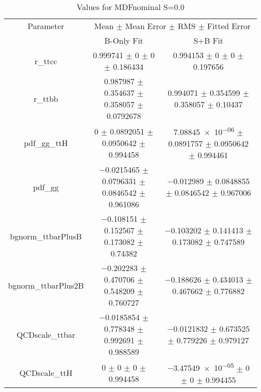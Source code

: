 \begin{table}
\centering
\caption{Values for MDFnominal S=0.0}
\begin{tabular}{ccc}
\toprule
Parameter & \multicolumn{2}{c}{Mean $\pm$ Mean Error $\pm$ RMS $\pm$ Fitted Error}\\
 & B-Only Fit & S+B Fit\\
\midrule
r\_ttcc & \num{0.999741} $\pm$ \num{0} $\pm$ \num{0} $\pm$ \num{0.186434} & \num{0.994153} $\pm$ \num{0} $\pm$ \num{0} $\pm$ \num{0.197656}\\
r\_ttbb & \num{0.987987} $\pm$ \num{0.354637} $\pm$ \num{0.358057} $\pm$ \num{0.0792678} & \num{0.994071} $\pm$ \num{0.354599} $\pm$ \num{0.358057} $\pm$ \num{0.10437}\\
pdf\_gg\_ttH & \num{0} $\pm$ \num{0.0892051} $\pm$ \num{0.0950642} $\pm$ \num{0.994458} & \num{7.08845e-06} $\pm$ \num{0.0891757} $\pm$ \num{0.0950642} $\pm$ \num{0.994461}\\
pdf\_gg & \num{-0.0215465} $\pm$ \num{0.0796331} $\pm$ \num{0.0846542} $\pm$ \num{0.961086} & \num{-0.012989} $\pm$ \num{0.0848855} $\pm$ \num{0.0846542} $\pm$ \num{0.967006}\\
bgnorm\_ttbarPlusB & \num{-0.108151} $\pm$ \num{0.152567} $\pm$ \num{0.173082} $\pm$ \num{0.74382} & \num{-0.103202} $\pm$ \num{0.141413} $\pm$ \num{0.173082} $\pm$ \num{0.747589}\\
bgnorm\_ttbarPlus2B & \num{-0.202283} $\pm$ \num{0.470706} $\pm$ \num{0.548209} $\pm$ \num{0.760727} & \num{-0.188626} $\pm$ \num{0.434013} $\pm$ \num{0.467662} $\pm$ \num{0.776882}\\
QCDscale\_ttbar & \num{-0.0185854} $\pm$ \num{0.778348} $\pm$ \num{0.992691} $\pm$ \num{0.988589} & \num{-0.0121832} $\pm$ \num{0.673525} $\pm$ \num{0.779226} $\pm$ \num{0.979127}\\
QCDscale\_ttH & \num{0} $\pm$ \num{0} $\pm$ \num{0} $\pm$ \num{0.994458} & \num{-3.47549e-05} $\pm$ \num{0} $\pm$ \num{0} $\pm$ \num{0.994455}\\
\bottomrule
\end{tabular}
\end{table}